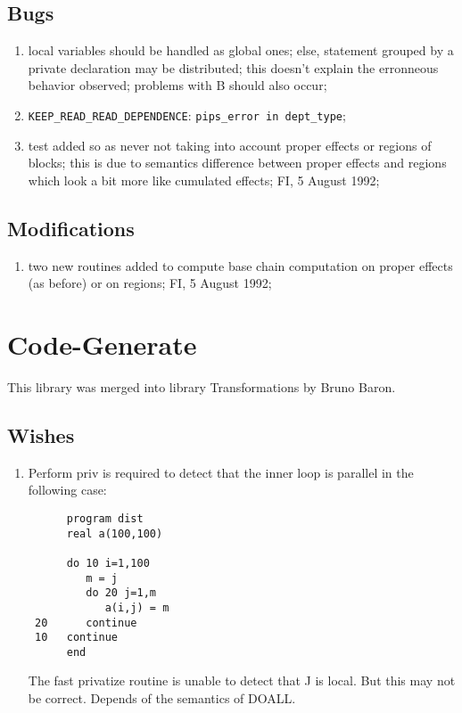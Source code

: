 \subsection{Bugs}

\begin{enumerate}

  \item local variables should be handled as global ones; else,
        statement grouped by a private declaration may be distributed;
        this doesn't explain the erronneous behavior observed; problems with
        B should also occur;

  \item \verb+KEEP_READ_READ_DEPENDENCE+: \verb+pips_error in dept_type+;

  \item test added so as never not taking into account proper effects or
        regions of blocks; this is due to semantics difference between
        proper effects and regions which look a bit more like cumulated
        effects; FI, 5 August 1992;

\end{enumerate}

\subsection{Modifications}

\begin{enumerate}

  \item two new routines added to compute base chain computation on
        proper effects (as before) or on regions; FI, 5 August 1992;

\end{enumerate}

\section{Code-Generate}

This library was merged into library Transformations by Bruno Baron.

\subsection{Wishes}

\begin{enumerate}

  \item Perform priv is required to detect that the inner loop is
parallel in the following case:
\begin{verbatim}
      program dist
      real a(100,100)

      do 10 i=1,100
         m = j
         do 20 j=1,m
            a(i,j) = m
 20      continue
 10   continue
      end
\end{verbatim}
The fast privatize routine is unable to detect that J is local.  But
this may not be correct. Depends of the semantics of DOALL.
      
\end{enumerate}

